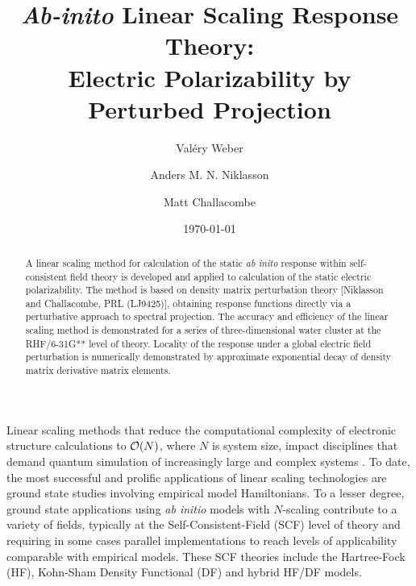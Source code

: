 \documentclass[prl,aps,twocolumn,showpacs,twocolumngrid,superbib]{revtex4}
\begin{document}
\title{\emph{Ab-inito} Linear Scaling Response Theory: \\ 
             Electric Polarizability by Perturbed Projection }

\author{Val\'ery Weber}
\author{Anders M. N. Niklasson}
\author{Matt Challacombe}

\date{\today}

\begin{abstract}
A linear scaling method for calculation of the static {\em ab inito} response within self-consistent field theory 
is developed and applied to calculation of the static electric polarizability.  The method is based on 
density matrix perturbation theory [Niklasson and Challacombe, PRL (LJ9425)], obtaining  response functions
directly via a perturbative approach to spectral projection.  The accuracy and efficiency of the linear scaling 
method is demonstrated for a series of three-dimensional 
water cluster at the RHF/6-31G** level of theory.  Locality of the response under a global electric field 
perturbation is numerically demonstrated by approximate exponential decay of density matrix derivative matrix elements.
\end{abstract}


\maketitle


Linear scaling methods that reduce the computational complexity of 
electronic structure calculations to ${\cal O}(N)$, where $N$ is system size, 
impact disciplines that demand quantum simulation of increasingly large and complex systems
\cite{GGalli96,DBowler97,SGoedecker99,POrdejon00,VGogonea01,SWu02}. 
To date, the most successful and prolific applications of linear scaling technologies are
ground state studies involving empirical model Hamiltonians.  
To a lesser degree, ground state applications using {\em ab initio} models 
with $N$-scaling contribute to a variety of fields, typically at the
Self-Consistent-Field (SCF) level of theory and requiring in some cases parallel 
implementations to reach levels of applicability comparable with empirical models. 
These SCF theories include the Hartree-Fock (HF), Kohn-Sham Density Functional (DF) 
and hybrid HF/DF models.
\end{document}

